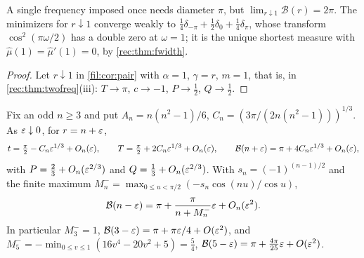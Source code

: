 \begin{corollary}\label{fil:cor:merger}
A single frequency imposed once needs diameter $\pi$, but $\lim_{r\downarrow1}\mathcal B(r)=2\pi$. The minimizers
for $r\downarrow1$ converge weakly to $\tfrac14\delta_{-\pi}+\tfrac12\delta_0+\tfrac14\delta_\pi$, whose transform
$\cos^2(\pi\omega/2)$ has a double zero at $\omega=1$; it is the unique shortest measure with
$\widehat\mu(1)=\widehat\mu'(1)=0$, by \cref{rec:thm:fwidth}.
\end{corollary}

\begin{proof}
Let $r\downarrow1$ in \cref{fil:cor:pair} with $\alpha=1$, $\gamma=r$, $m=1$, that is, in
\cref{rec:thm:twofreq}(iii): $T\to\pi$, $c\to-1$, $P\to\tfrac12$, $Q\to\tfrac12$.
\end{proof}

\begin{theorem}\label{rec:thm:cusp}
Fix an odd $n\ge3$ and put $A_n=n(n^2-1)/6$, $C_n=(3\pi/(2n(n^2-1)))^{1/3}$. As $\varepsilon\downarrow0$, for $r=n+\varepsilon$,
\[
 t=\tfrac\pi2-C_n\varepsilon^{1/3}+O_n(\varepsilon),\qquad T=\tfrac\pi2+2C_n\varepsilon^{1/3}+O_n(\varepsilon),\qquad
 \mathcal B(n+\varepsilon)=\pi+4C_n\varepsilon^{1/3}+O_n(\varepsilon),
\]
with $P=\tfrac23+O_n(\varepsilon^{2/3})$ and $Q=\tfrac13+O_n(\varepsilon^{2/3})$. With $s_n=(-1)^{(n-1)/2}$ and the finite
maximum $M_n^-=\max_{0\le u<\pi/2}(-s_n\cos(nu)/\cos u)$,
\[
 \mathcal B(n-\varepsilon)=\pi+\frac{\pi}{n+M_n^-}\varepsilon+O_n(\varepsilon^2).
\]
In particular $M_3^-=1$, $\mathcal B(3-\varepsilon)=\pi+\pi\varepsilon/4+O(\varepsilon^2)$, and $M_5^-=-\min_{0\le v\le1}(16v^4-20v^2+5)=\tfrac54$,
$\mathcal B(5-\varepsilon)=\pi+\tfrac{4\pi}{25}\varepsilon+O(\varepsilon^2)$.
\end{theorem}

